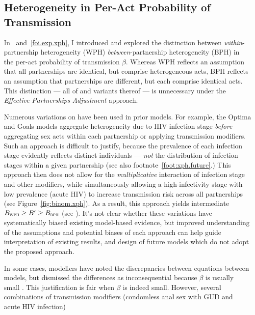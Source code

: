 \subsection{Heterogeneity in Per-Act Probability of Transmission}\label{foi.disc.xph}
In ~and~\ref{foi.exp.xph}, I introduced and explored the distinction between
\emph{within}-partnership heterogeneity (WPH) \vs \emph{between}-partnership heterogeneity (BPH)
in the per-act probability of transmission $\beta$. Whereas
WPH reflects an assumption that all partnerships are identical, but comprise heterogeneous acts,
BPH reflects an assumption that partnerships are different, but each comprise identical acts.
This distinction --- \ie all of  and variants thereof ---
is unnecessary under the \emph{Effective Partnerships Adjustment} approach.
\par
Numerous variations on  have been used in prior models.
For example, the Optima \cite{Kerr2015} and Goals \cite{Stover2014} models
aggregate heterogeneity due to HIV infection stage
\emph{before} aggregating sex acts within each partnership or applying transmission modifiers.
Such an approach is difficult to justify, because
the prevalence of each infection stage evidently reflects distinct individuals
--- \emph{not} the distribution of infection stages within a given partnership
(see also footnote~\ref{foot:xph.future}.)
This approach then does not allow for
the \emph{multiplicative} interaction of infection stage and other modifiers,
while simultaneously allowing a high-infectivity stage with low prevalence (\eg acute HIV)
to increase transmission risk across all partnerships (see Figure~\ref{fig:binom.xph}).
As a result, this approach yields intermediate $B_{\textsc{wph}} \ge B' \ge B_{\textsc{bph}}$
(see ).
It's not clear whether these variations have systematically biased existing model-based evidence,
but improved understanding of the assumptions and potential biases of each approach
can help guide interpretation of existing results,
and design of future models which do not adopt the proposed approach.
\par
In some cases, modellers have noted the discrepancies between equations between models,
but dismissed the differences as inconsequential because $\beta$ is usually small
\cite{Kerr2015}. %
This justification is fair when $\beta$ is indeed small.
However, several combinations of transmission modifiers
(\eg condomless anal sex with GUD and acute HIV infection) \cite{Boily2009,Fox2011}

